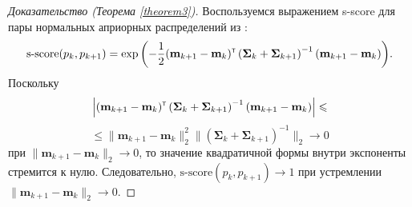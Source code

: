 \begin{proof}[Доказательство (Теорема \ref{theorem3})]
    Воспользуемся выражением s-score для пары нормальных априорных распределений из \cite{Aduenko2017}:
    \[ \text{s-score}(p_k, p_{k+1}) = \exp{\left( -\dfrac{1}{2} (\mathbf{m}_{k+1} - \mathbf{m}_k)^{\text{\tiny\sffamily\upshape\mdseries T}}\left( \mathbf{\Sigma}_k + \mathbf{\Sigma}_{k+1} \right)^{-1} (\mathbf{m}_{k+1} - \mathbf{m}_k) \right)}. \]
    Поскольку
    \[ \left| (\mathbf{m}_{k+1} - \mathbf{m}_k)^{\text{\tiny\sffamily\upshape\mdseries T}} \left( \mathbf{\Sigma}_k + \mathbf{\Sigma}_{k+1} \right)^{-1} (\mathbf{m}_{k+1} - \mathbf{m}_k) \right| \leqslant \]
    \[ \leqslant \| \mathbf{m}_{k+1} - \mathbf{m}_k \|_2^2 \| \left( \mathbf{\Sigma}_k + \mathbf{\Sigma}_{k+1} \right)^{-1} \|_2 \to 0 \]
    при $\| \mathbf{m}_{k+1} - \mathbf{m}_k \|_2 \to 0$, то значение квадратичной формы внутри экспоненты стремится к нулю. Следовательно, $\text{s-score}(p_k, p_{k+1}) \to 1$ при устремлении $\| \mathbf{m}_{k+1} - \mathbf{m}_k \|_2 \to 0$.
\end{proof}

